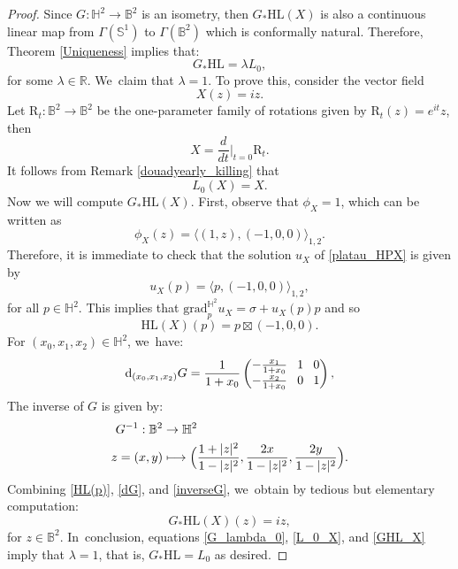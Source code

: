 \documentclass[10pt]{amsart}
\newcommand\mto{\mathchoice{\longmapsto}{\mapsto}{\mapsto}{\mapsto}}
\theoremstyle{plain}
\theoremstyle{definition}
\newcommand{\grad}{\mathrm{grad}^{\mathbb{H}^2}}
\begin{document}
\begin{proof}
Since \(G:\mathbb{H}^2 \to \mathbb{B}^2\) is an isometry, then \(G_*\mathrm{HL}(X)\) is also a continuous linear map from \(\Gamma(\mathbb{S}^1)\) to \(\Gamma(\mathbb{B}^2)\) which is conformally natural. Therefore, Theorem \ref{Uniqueness} implies that:
\begin{equation}\label{G_lambda_0}
G_*\mathrm{HL} = \lambda L_0,
\end{equation}
for some \(\lambda \in \mathbb{R}\). We~claim that \(\lambda = 1\). To prove this, consider the vector field
\[ X(z) = iz. \]
Let \(\mathrm{R}_t:\mathbb{B}^2 \to \mathbb{B}^2\) be the one-parameter family of rotations given by \(\mathrm{R}_t(z) = e^{it}z\), then
\[ X = \frac{d}{dt}\Big\lvert_{t=0}\mathrm{R}_t. \]
It follows from Remark \ref{douadyearly_killing} that
\begin{equation}\label{L_0_X}
L_0(X) = X.
\end{equation}
Now we will compute \(G_*\mathrm{HL}(X)\). First, observe that \(\phi_X = 1\), which can be written as
\[ \phi_X(z) = \langle (1,z), (-1,0,0) \rangle_{1,2}. \]
Therefore, it is immediate to check that the solution \(u_X\) of \eqref{platau_HPX} is given by
\[ u_X(p) = \langle p, (-1,0,0) \rangle_{1,2}, \]
for all \(p \in \mathbb{H}^2\). This implies that \(\grad_p u_X = \sigma + u_X(p) p\) and so
\begin{equation}\label{HL(p)}
\mathrm{HL}(X)(p) = p \boxtimes (-1,0,0).
\end{equation}
For \((x_0,x_1,x_2) \in \mathbb{H}^2\), we~have:
\begin{equation}\label{dG}
\arraycolsep4pt
\mathrm{d}_{(x_0,x_1,x_2)}G = \frac{1}{1 + x_0} \begin{pmatrix}
-\frac{x_1}{1 + x_0} & 1 & 0 \\
-\frac{x_2}{1 + x_0} & 0 & 1
\end{pmatrix},
\end{equation}
The inverse of \(G\) is given by:
\begin{equation}\label{inverseG}
\begin{aligned}
G^{-1}:\mathbb{B}^2 & \to \mathbb{H}^2 \\
z = (x,y) & \mto\Bigl(\frac{1 + \lvert z \rvert^2}{1 - \lvert z \rvert^2}, \frac{2x}{1 - \lvert z \rvert^2}, \frac{2y}{1 - \lvert z \rvert^2} \Bigr).
\end{aligned}
\end{equation}
Combining \eqref{HL(p)}, \eqref{dG}, and \eqref{inverseG}, we~obtain by tedious but elementary computation:
\begin{equation}\label{GHL_X}
G_*\mathrm{HL}(X)(z) = iz,
\end{equation}
for \(z \in \mathbb{B}^2\). In~conclusion, equations \eqref{G_lambda_0}, \eqref{L_0_X}, and \eqref{GHL_X} imply that \(\lambda = 1\), that is, \(G_*\mathrm{HL} = L_0\) as desired.
\end{proof}
\end{document}
